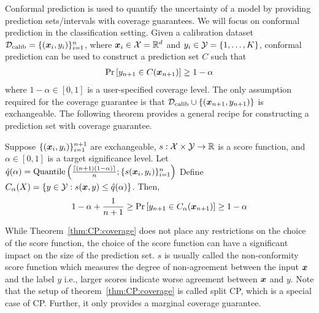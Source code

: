 Conformal prediction is used to quantify the uncertainty of a model by providing prediction sets/intervals with coverage guarantees.
We will focus on conformal prediction in the classification setting.
Given a calibration dataset ${\mathcal{D}}_{\text{calib}} = \{({\bm{x}}_i, y_i)\}_{i=1}^n$, where ${\bm{x}}_i \in {\mathcal{X}} = \mathbb{R}^d$ and $y_i \in {\mathcal{Y}} = \{1, \dots, K\}$, conformal prediction can be used to construct a prediction set $C$ such that
\begin{align*}
    \Pr\left[y_{n+1} \in C({\bm{x}}_{n+1}) \right] \geq 1 - \alpha
\end{align*}
where $1 - \alpha \in [0, 1]$ is a user-specified coverage level.
The only assumption required for the coverage guarantee is that ${\mathcal{D}}_{\text{calib}} \cup \{({\bm{x}}_{n+1}, y_{n+1})\}$ is exchangeable.
The following theorem provides a general recipe for constructing a prediction set with coverage guarantee.
\begin{theorem}
    Suppose $\{({\bm{x}}_i, y_i)\}_{i=1}^{n+1}$ are exchangeable, $s: {\mathcal{X}} \times {\mathcal{Y}} \rightarrow \mathbb{R}$ is a score function, and $\alpha \in [0, 1]$ is a target significance level.
    Let $\hat{q}(\alpha) = \text{Quantile}\left(\frac{\lceil(n+1)(1-\alpha)\rceil}{n}; \{s({\bm{x}}_i, y_i)\}_{i=1}^{n}\right)$
    Define $C_{\alpha}(X) = \{y \in {\mathcal{Y}}: s({\bm{x}}, y) \leq \hat{q}(\alpha)\}$.
    Then,
    \begin{align}
        1 - \alpha +\frac{1}{n+1} \geq \Pr\left[y_{n+1} \in C_{\alpha}({\bm{x}}_{n+1}) \right] \geq 1 - \alpha
        \label{eq:CP:coverage}
    \end{align}
    \label{thm:CP:coverage}
\end{theorem}

While Theorem~\ref{thm:CP:coverage} does not place any restrictions on the choice of the score function, the choice of the score function can have a significant impact on the size of the prediction set.
$s$ is usually called the non-conformity score function which measures the degree of non-agreement between the input ${\bm{x}}$ and the label $y$ i.e., larger scores indicate worse agreement between ${\bm{x}}$ and $y$.
Note that the setup of theorem~\ref{thm:CP:coverage} is called split CP, which is a special case of CP.
Further, it only provides a marginal coverage guarantee.

